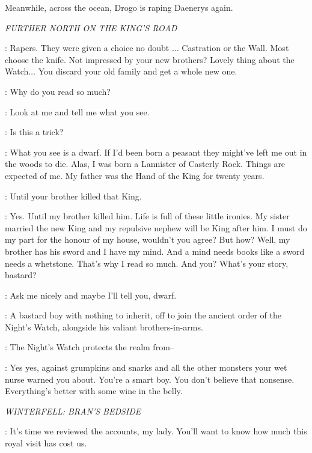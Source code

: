 \scene

\n Meanwhile, across the ocean, Drogo is raping Daenerys again.

\scene

\textit{FURTHER NORTH ON THE KING'S ROAD}


\TYRION: Rapers. They were given a choice no doubt $\ldots$ Castration or the Wall. Most choose the knife. Not impressed by your new brothers? Lovely thing about the Watch$\ldots$ You discard your old family and get a whole new one. 

\JON: Why do you read so much? 

\TYRION: Look at me and tell me what you see. 

\JON: Is this a trick? 

\TYRION: What you see is a dwarf. If I'd been born a peasant they might've left me out in the woods to die. Alas, I was born a Lannister of Casterly Rock. Things are expected of me. My father was the Hand of the King for twenty years. 

\JON: Until your brother killed that King. 

\TYRION: Yes. Until my brother killed him. Life is full of these little ironies. My sister married the new King and my repulsive nephew will be King after him. I must do my part for the honour of my house, wouldn't you agree? But how? Well, my brother has his sword and I have my mind. And a mind needs books like a sword needs a whetstone. That's why I read so much. And you? What's your story, bastard? 

\JON: Ask me nicely and maybe I'll tell you, dwarf. 

\TYRION: A bastard boy with nothing to inherit, off to join the ancient order of the Night's Watch, alongside his valiant brothers-in-arms. 

\JON: The Night's Watch protects the realm from--

\TYRION: Yes yes, against grumpkins and snarks and all the other monsters your wet nurse warned you about. You're a smart boy. You don't believe that nonsense. Everything's better with some wine in the belly. 

\scene

\textit{WINTERFELL: BRAN'S BEDSIDE}


\LUWIN: It's time we reviewed the accounts, my lady. You'll want to know how much this royal visit has cost us. 

